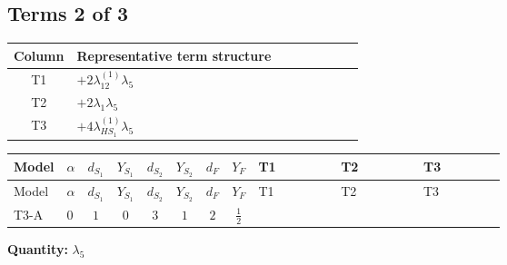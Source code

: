 \documentclass[8pt]{article}
\begin{document}
\begin{landscape}
\subsection*{Terms 2 of 3}
\begin{center}
\begin{tabular}{@{}c >{\raggedright\arraybackslash}p{0.82\linewidth}@{}}
\toprule
Column & Representative term structure \\
\midrule
T1 & \(\displaystyle +2 {\lambda_{12}^{(1)}} {\lambda_5}\) \\
\midrule
T2 & \(\displaystyle +2 {\lambda_1} {\lambda_5}\) \\
\midrule
T3 & \(\displaystyle +4 {\lambda_{HS_1}^{(1)}} {\lambda_5}\) \\
\midrule
\bottomrule
\end{tabular}
\end{center}
\smallskip
\tiny
\begin{longtable}{@{}llcccccc >{\raggedright\arraybackslash}p{0.21\linewidth} >{\raggedright\arraybackslash}p{0.21\linewidth} >{\raggedright\arraybackslash}p{0.21\linewidth}@{}}
\toprule
Model & $\alpha$ & $d_{S_1}$ & $Y_{S_1}$ & $d_{S_2}$ & $Y_{S_2}$ & $d_F$ & $Y_F$ & T1 & T2 & T3 \\
\midrule
\endfirsthead
\toprule
Model & $\alpha$ & $d_{S_1}$ & $Y_{S_1}$ & $d_{S_2}$ & $Y_{S_2}$ & $d_F$ & $Y_F$ & T1 & T2 & T3 \\
\midrule
\endhead
T3-A & $0$ & $1$ & $0$ & $3$ & $1$ & $2$ & $\frac{1}{2}$ & \scriptsize\adjustbox{max width=\linewidth}{$\begin{gathered} +2 {\lambda_{12}^{(1)}} {\lambda_5}\end{gathered}$} & \scriptsize\adjustbox{max width=\linewidth}{$\begin{gathered} +2 {\lambda_1} {\lambda_5}\end{gathered}$} & \scriptsize\adjustbox{max width=\linewidth}{$\begin{gathered} +4 {\lambda_{HS_1}^{(1)}} {\lambda_5}\end{gathered}$} \\
\midrule
\bottomrule
\end{longtable}
\clearpage
\noindent\textbf{Quantity: }$\lambda_5$\par\smallskip

\end{landscape}
\end{document}
